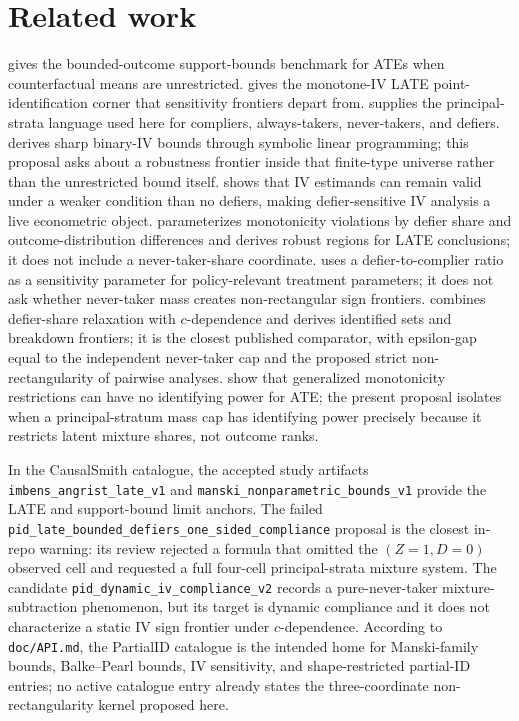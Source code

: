 \documentclass[11pt]{article}
\theoremstyle{definition}
\theoremstyle{plain}
\theoremstyle{remark}
\begin{document}
\section{Related work}
\citet{Manski1990} gives the bounded-outcome support-bounds benchmark for ATEs
when counterfactual means are unrestricted.  \citet{ImbensAngrist1994} gives
the monotone-IV LATE point-identification corner that sensitivity frontiers
depart from.  \citet{AngristImbensRubin1996} supplies the principal-strata
language used here for compliers, always-takers, never-takers, and defiers.
\citet{BalkePearl1997} derives sharp binary-IV bounds through symbolic linear
programming; this proposal asks about a robustness frontier inside that
finite-type universe rather than the unrestricted bound itself.
\citet{DeChaisemartin2017} shows that IV estimands can remain valid under a
weaker condition than no defiers, making defier-sensitive IV analysis a live
econometric object.  \citet{Noack2021} parameterizes monotonicity violations by
defier share and outcome-distribution differences and derives robust regions
for LATE conclusions; it does not include a never-taker-share coordinate.
\citet{Yap2022} uses a defier-to-complier ratio as a sensitivity parameter for
policy-relevant treatment parameters; it does not ask whether never-taker mass
creates non-rectangular sign frontiers.  \citet{Picchetti2026} combines
defier-share relaxation with \(c\)-dependence and derives identified sets and
breakdown frontiers; it is the closest published comparator, with epsilon-gap
equal to the independent never-taker cap and the proposed strict
non-rectangularity of pairwise analyses.  \citet{BaiHuangMoonShaikhVytlacil2024}
show that generalized monotonicity restrictions can have no identifying power
for ATE; the present proposal isolates when a principal-stratum mass cap has
identifying power precisely because it restricts latent mixture shares, not
outcome ranks.

In the CausalSmith catalogue, the accepted study artifacts
\texttt{imbens\_angrist\_late\_v1} and
\texttt{manski\_nonparametric\_bounds\_v1} provide the LATE and support-bound
limit anchors.  The failed
\texttt{pid\_late\_bounded\_defiers\_one\_sided\_compliance} proposal is the
closest in-repo warning: its review rejected a formula that omitted the
\((Z=1,D=0)\) observed cell and requested a full four-cell principal-strata
mixture system.  The candidate
\texttt{pid\_dynamic\_iv\_compliance\_v2} records a pure-never-taker
mixture-subtraction phenomenon, but its target is dynamic compliance and it
does not characterize a static IV sign frontier under \(c\)-dependence.
According to \texttt{doc/API.md}, the PartialID catalogue is the intended home
for Manski-family bounds, Balke--Pearl bounds, IV sensitivity, and
shape-restricted partial-ID entries; no active catalogue entry already states
the three-coordinate non-rectangularity kernel proposed here.
\end{document}
